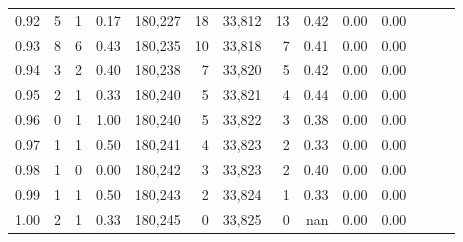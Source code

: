 \begin{tabular}{rrrrrrrrrrrrrr}
0.92 &      5 &      1 &  0.17 &  180,227 &       18 &  33,812 &      13 &  0.42 &  0.00 &      0.00 \\
0.93 &      8 &      6 &  0.43 &  180,235 &       10 &  33,818 &       7 &  0.41 &  0.00 &      0.00 \\
0.94 &      3 &      2 &  0.40 &  180,238 &        7 &  33,820 &       5 &  0.42 &  0.00 &      0.00 \\
0.95 &      2 &      1 &  0.33 &  180,240 &        5 &  33,821 &       4 &  0.44 &  0.00 &      0.00 \\
0.96 &      0 &      1 &  1.00 &  180,240 &        5 &  33,822 &       3 &  0.38 &  0.00 &      0.00 \\
0.97 &      1 &      1 &  0.50 &  180,241 &        4 &  33,823 &       2 &  0.33 &  0.00 &      0.00 \\
0.98 &      1 &      0 &  0.00 &  180,242 &        3 &  33,823 &       2 &  0.40 &  0.00 &      0.00 \\
0.99 &      1 &      1 &  0.50 &  180,243 &        2 &  33,824 &       1 &  0.33 &  0.00 &      0.00 \\
1.00 &      2 &      1 &  0.33 &  180,245 &        0 &  33,825 &       0 &   nan &  0.00 &      0.00 \\
\bottomrule
\end{tabular}
